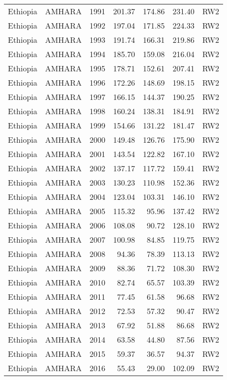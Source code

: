\begin{longtable}{lllrrrl}
  Ethiopia & AMHARA & 1991 & 201.37 & 174.86 & 231.40 & RW2 \\ 
  Ethiopia & AMHARA & 1992 & 197.04 & 171.85 & 224.33 & RW2 \\ 
  Ethiopia & AMHARA & 1993 & 191.74 & 166.31 & 219.86 & RW2 \\ 
  Ethiopia & AMHARA & 1994 & 185.70 & 159.08 & 216.04 & RW2 \\ 
  Ethiopia & AMHARA & 1995 & 178.71 & 152.61 & 207.41 & RW2 \\ 
  Ethiopia & AMHARA & 1996 & 172.26 & 148.69 & 198.15 & RW2 \\ 
  Ethiopia & AMHARA & 1997 & 166.15 & 144.37 & 190.25 & RW2 \\ 
  Ethiopia & AMHARA & 1998 & 160.24 & 138.31 & 184.91 & RW2 \\ 
  Ethiopia & AMHARA & 1999 & 154.66 & 131.22 & 181.47 & RW2 \\ 
  Ethiopia & AMHARA & 2000 & 149.48 & 126.76 & 175.90 & RW2 \\ 
  Ethiopia & AMHARA & 2001 & 143.54 & 122.82 & 167.10 & RW2 \\ 
  Ethiopia & AMHARA & 2002 & 137.17 & 117.72 & 159.41 & RW2 \\ 
  Ethiopia & AMHARA & 2003 & 130.23 & 110.98 & 152.36 & RW2 \\ 
  Ethiopia & AMHARA & 2004 & 123.04 & 103.31 & 146.10 & RW2 \\ 
  Ethiopia & AMHARA & 2005 & 115.32 & 95.96 & 137.42 & RW2 \\ 
  Ethiopia & AMHARA & 2006 & 108.08 & 90.72 & 128.10 & RW2 \\ 
  Ethiopia & AMHARA & 2007 & 100.98 & 84.85 & 119.75 & RW2 \\ 
  Ethiopia & AMHARA & 2008 & 94.36 & 78.39 & 113.13 & RW2 \\ 
  Ethiopia & AMHARA & 2009 & 88.36 & 71.72 & 108.30 & RW2 \\ 
  Ethiopia & AMHARA & 2010 & 82.74 & 65.57 & 103.39 & RW2 \\ 
  Ethiopia & AMHARA & 2011 & 77.45 & 61.58 & 96.68 & RW2 \\ 
  Ethiopia & AMHARA & 2012 & 72.53 & 57.32 & 90.47 & RW2 \\ 
  Ethiopia & AMHARA & 2013 & 67.92 & 51.88 & 86.68 & RW2 \\ 
  Ethiopia & AMHARA & 2014 & 63.58 & 44.80 & 87.56 & RW2 \\ 
  Ethiopia & AMHARA & 2015 & 59.37 & 36.57 & 94.37 & RW2 \\ 
  Ethiopia & AMHARA & 2016 & 55.43 & 29.00 & 102.09 & RW2 \\ 

\end{longtable}
